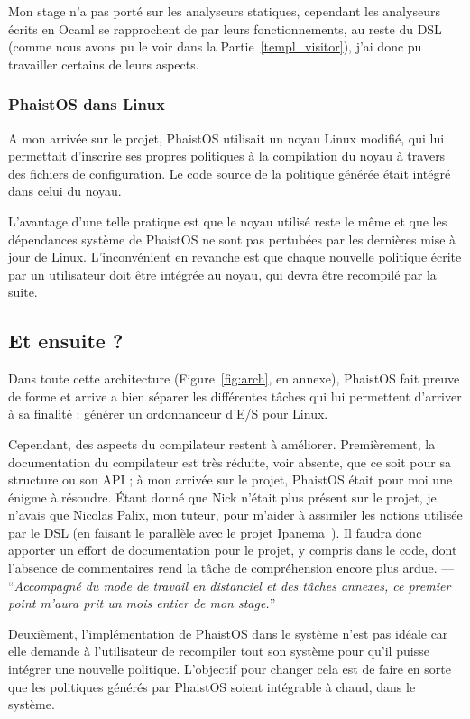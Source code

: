 Mon stage n'a pas porté sur les analyseurs statiques, cependant les analyseurs 
écrits en Ocaml se rapprochent de par leurs fonctionnements, au reste du DSL 
(comme nous avons pu le voir dans la Partie~\ref{templ_visitor}), j'ai donc pu 
travailler certains de leurs aspects.

\subsubsection{PhaistOS dans Linux}

A mon arrivée sur le projet, PhaistOS utilisait un noyau Linux modifié, qui lui 
permettait d'inscrire ses propres politiques à la compilation du noyau à 
travers des fichiers de configuration. Le code source de la politique générée 
était intégré dans celui du noyau.

L'avantage d'une telle pratique est que le noyau utilisé reste le même et que 
les dépendances système de PhaistOS ne sont pas pertubées par les dernières 
mise à jour de Linux. L'inconvénient en revanche est que chaque nouvelle 
politique écrite par un utilisateur doit être intégrée au noyau, qui devra être 
recompilé par la suite.

\subsection{Et ensuite ?}

Dans toute cette architecture (Figure~\ref{fig:arch}, en annexe), PhaistOS fait 
preuve de forme et arrive a bien séparer les différentes tâches qui lui 
permettent d'arriver à sa finalité : générer un ordonnanceur d'E/S pour Linux.

Cependant, des aspects du compilateur restent à améliorer. Premièrement, la 
documentation du compilateur est très réduite, voir absente, que ce soit pour 
sa structure ou son API ; à mon arrivée sur le projet, PhaistOS était pour moi 
une énigme à résoudre. Étant donné que Nick n'était plus présent sur le projet, 
je n'avais que Nicolas Palix, mon tuteur, pour m'aider à assimiler les notions 
utilisée par le DSL (en faisant le parallèle avec le projet Ipanema~\cite
{lepers2020provable}). Il faudra donc apporter un effort de documentation pour 
le projet, y compris dans le code, dont l'absence de commentaires rend la tâche 
de compréhension encore plus ardue. --- ``\textit{Accompagné du mode de travail 
en distanciel et des tâches annexes, ce premier point m'aura prit un mois 
entier de mon stage.}''

Deuxièment, l'implémentation de PhaistOS dans le système n'est pas idéale car 
elle demande à l'utilisateur de recompiler tout son système pour qu'il puisse 
intégrer une nouvelle politique. L'objectif pour changer cela est de faire en 
sorte que les politiques générés par PhaistOS soient intégrable à chaud, dans 
le système.

